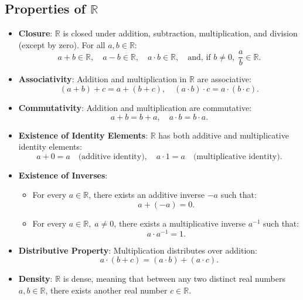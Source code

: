 \subsection{Properties of \( \mathbb{R} \)}
\begin{itemize}
    \item \textbf{Closure}: \( \mathbb{R} \) is closed under addition, subtraction, multiplication, and division (except by zero). For all \( a, b \in \mathbb{R} \):
    \[
    a + b \in \mathbb{R}, \quad a - b \in \mathbb{R}, \quad a \cdot b \in \mathbb{R}, \quad \text{and, if } b \neq 0, \; \frac{a}{b} \in \mathbb{R}.
    \]
    
    \item \textbf{Associativity}: Addition and multiplication in \( \mathbb{R} \) are associative:
    \[
    (a + b) + c = a + (b + c), \quad (a \cdot b) \cdot c = a \cdot (b \cdot c).
    \]

    \item \textbf{Commutativity}: Addition and multiplication are commutative:
    \[
    a + b = b + a, \quad a \cdot b = b \cdot a.
    \]

    \item \textbf{Existence of Identity Elements}: \( \mathbb{R} \) has both additive and multiplicative identity elements:
    \[
    a + 0 = a \quad \text{(additive identity)}, \quad a \cdot 1 = a \quad \text{(multiplicative identity)}.
    \]

    \item \textbf{Existence of Inverses}:
    \begin{itemize}
        \item For every \( a \in \mathbb{R} \), there exists an additive inverse \( -a \) such that:
        \[
        a + (-a) = 0.
        \]
        \item For every \( a \in \mathbb{R}, \; a \neq 0 \), there exists a multiplicative inverse \( a^{-1} \) such that:
        \[
        a \cdot a^{-1} = 1.
        \]
    \end{itemize}

    \item \textbf{Distributive Property}: Multiplication distributes over addition:
    \[
    a \cdot (b + c) = (a \cdot b) + (a \cdot c).
    \]

    \item \textbf{Density}: \( \mathbb{R} \) is dense, meaning that between any two distinct real numbers \( a, b \in \mathbb{R} \), there exists another real number \( c \in \mathbb{R} \).


\end{itemize}
